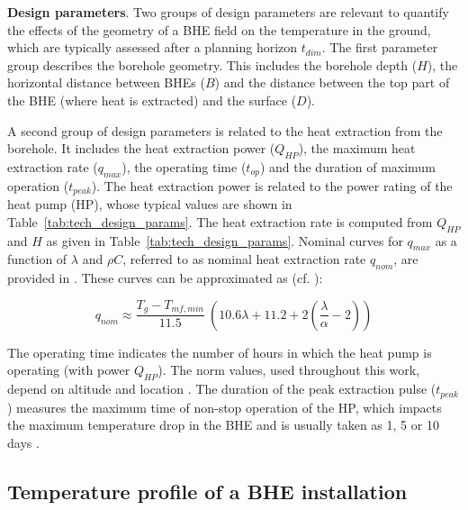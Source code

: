\textbf{Design parameters}. Two groups of design parameters are relevant to quantify the effects of the geometry of a BHE field on the temperature in the ground, which are typically assessed after a planning horizon $t_\mathit{dim}$. 
The first parameter group describes the borehole geometry. This includes the borehole depth ($H$), the horizontal distance between BHEs ($B$) and the distance between the top part of the BHE (where heat is extracted) and the surface ($D$). 

A second group of design parameters is related to the heat extraction from the borehole. It includes the heat extraction power ($Q_{HP}$), the maximum heat extraction rate ($q_\mathit{max}$), the operating time ($t_{op}$) and the duration of maximum operation ($t_{peak}$). The heat extraction power is related to the power rating of the heat pump (HP), whose typical values are shown in Table~\ref{tab:tech_design_params}. 
The heat extraction rate is computed from $Q_{HP}$ and $H$ as given in Table~\ref{tab:tech_design_params}. Nominal curves for $q_\mathit{max}$ as a function of $\lambda$ and $\rho C$, referred to as nominal heat extraction rate $q_{nom}$, are provided in \cite{sia_sondes_2010}. These curves can be approximated as (cf. \cite{sia_sondes_2010}):

\begin{equation}
\label{eq:q_nom}
    q_{nom} \approx \frac{T_g - T_\mathit{mf, min}}{11.5} \ \left( 10.6 \lambda + 11.2 + 2 \left( \frac{\lambda}{\alpha} - 2 \right) \right)
\end{equation}

The operating time indicates the number of hours in which the heat pump is operating (with power $Q_{HP}$). The norm values, used throughout this work, depend on altitude and location \cite{sia_sondes_2010}.
The duration of the peak extraction pulse ($t_\mathit{peak}$) measures the maximum time of non-stop operation of the HP, which impacts the maximum temperature drop in the BHE and is usually taken as 1, 5 or 10 days \cite{pahud_geothermal_2002}.

\subsection{Temperature profile of a BHE installation}
\label{model_intro}

